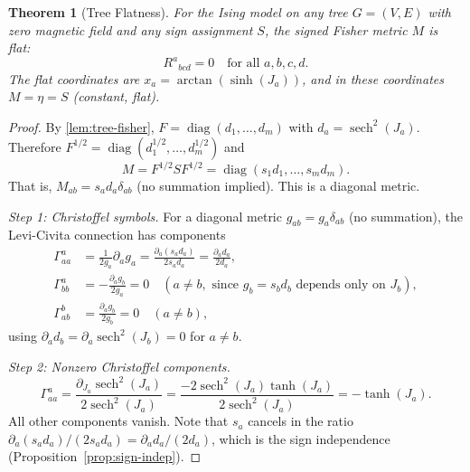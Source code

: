 \documentclass[11pt]{article}
\newtheorem{theorem}{Theorem}[section]
\theoremstyle{definition}
\theoremstyle{remark}
\newcommand{\Fish}{F}
\newcommand{\sgn}{S}
\newcommand{\Met}{M}
\newcommand{\Chr}[2]{\Gamma^{#1}_{#2}}
\newcommand{\diag}{\operatorname{diag}}
\newcommand{\sech}{\operatorname{sech}}
\newcommand{\Ric}{R}
\begin{document}
\begin{theorem}[Tree Flatness]
\label{thm:tree-flat}
For the Ising model on any tree $G = (V, E)$ with zero magnetic field
and any sign assignment $\sgn$, the signed Fisher metric $\Met$ is flat:
\begin{equation}
  \Ric^a{}_{bcd} = 0 \quad \text{for all } a, b, c, d.
  \label{eq:tree-flat}
\end{equation}
The flat coordinates are $x_a = \arctan(\sinh(J_a))$, and in these
coordinates $\Met = \eta = \sgn$ (constant, flat).
\end{theorem}

\begin{proof}
By \cref{lem:tree-fisher}, $\Fish = \diag(d_1, \ldots, d_m)$ with
$d_a = \sech^2(J_a)$. Therefore $\Fish^{1/2} = \diag(d_1^{1/2}, \ldots,
d_m^{1/2})$ and
\begin{equation}
  \Met = \Fish^{1/2} \sgn \Fish^{1/2} = \diag(s_1 d_1, \ldots, s_m d_m).
  \label{eq:tree-metric-diagonal}
\end{equation}
That is, $\Met_{ab} = s_a d_a \delta_{ab}$ (no summation implied). This
is a diagonal metric.

\textit{Step 1: Christoffel symbols.} For a diagonal metric $g_{ab} = g_a \delta_{ab}$
(no summation), the Levi-Civita connection has components
\begin{align}
  \Chr{a}{aa} &= \frac{1}{2g_a} \partial_a g_a
    = \frac{\partial_a(s_a d_a)}{2 s_a d_a}
    = \frac{\partial_a d_a}{2 d_a}, \label{eq:chr-diagonal-aaa}\\
  \Chr{a}{bb} &= -\frac{\partial_a g_b}{2 g_a} = 0
    \quad (a \neq b, \text{ since } g_b = s_b d_b \text{ depends only on } J_b), \label{eq:chr-diagonal-abb}\\
  \Chr{b}{ab} &= \frac{\partial_a g_b}{2 g_b} = 0
    \quad (a \neq b), \label{eq:chr-diagonal-bab}
\end{align}
using $\partial_a d_b = \partial_a \sech^2(J_b) = 0$ for $a \neq b$.

\textit{Step 2: Nonzero Christoffel components.}
\begin{equation}
  \Chr{a}{aa} = \frac{\partial_{J_a} \sech^2(J_a)}{2 \sech^2(J_a)}
    = \frac{-2 \sech^2(J_a) \tanh(J_a)}{2 \sech^2(J_a)}
    = -\tanh(J_a).
  \label{eq:chr-tree}
\end{equation}
All other components vanish. Note that $s_a$ cancels in the ratio
$\partial_a(s_a d_a)/(2 s_a d_a) = \partial_a d_a/(2 d_a)$, which
is the sign independence (Proposition~\ref{prop:sign-indep}).


\end{proof}
\end{document}
